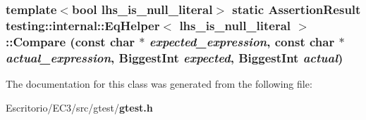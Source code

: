 \subsubsection{\setlength{\rightskip}{0pt plus 5cm}template$<$bool lhs\_\-is\_\-null\_\-literal$>$ static {\bf AssertionResult} {\bf testing::internal::EqHelper}$<$ lhs\_\-is\_\-null\_\-literal $>$::Compare (const char $\ast$ {\em expected\_\-expression}, const char $\ast$ {\em actual\_\-expression}, {\bf BiggestInt} {\em expected}, {\bf BiggestInt} {\em actual})\hspace{0.3cm}{\tt  [inline, static]}}\label{classtesting_1_1internal_1_1EqHelper_6e08bfbe40299a13f7ecfc1e83dffa47}




The documentation for this class was generated from the following file:\begin{CompactItemize}
\item 
Escritorio/EC3/src/gtest/{\bf gtest.h}\end{CompactItemize}
